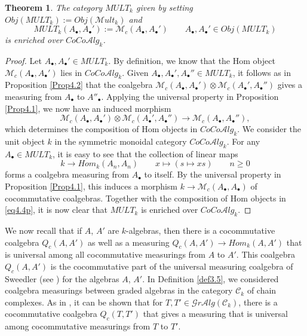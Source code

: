 \documentclass[10pt, colorlinks]{article}
\numberwithin{equation}{section} \DeclareMathSizes{2}{10}{12}{13}
\newtheorem{Thm}[thm]{Theorem}
\begin{document}
   
     \begin{Thm}\label{T4.3xq} The category $MULT_k$ given by setting      $Obj(MULT_k):=Obj(\mathscr Mult_k)$ and
\begin{equation}
MULT_k(A_\bullet,A_\bullet'):=\mathcal M_c(A_\bullet,A_\bullet') \qquad A_\bullet,A_\bullet'\in Obj(MULT_k)
\end{equation}
  is enriched over $CoCo\mathcal{A}lg_k$.
    \end{Thm}


    
    \begin{proof}
    Let $A_\bullet,A_\bullet'\in {M}ULT_k$. By definition, we know that the Hom object $\mathcal M_c(A_\bullet,A_\bullet')$ lies in $CoCo\mathcal Alg_k$.  Given $A_\bullet,A_\bullet',A_\bullet''\in MULT_k$,  it follows as in Proposition \ref{Prop4.2} that  the coalgebra $ \mathcal M_c(A_\bullet,A_\bullet')\otimes \mathcal M_c(A_\bullet',A_\bullet'')$ gives a measuring from $A_\bullet$ to $A''_\bullet$. Applying the universal property in Proposition \ref{Prop4.1}, we now have an induced morphism
        \begin{equation}\label{eq4.4p}
            \mathcal M_c(A_\bullet,A_\bullet')\otimes \mathcal M_c(A_\bullet',A_\bullet'')\longrightarrow  \mathcal M_c(A_\bullet,A_\bullet''),
        \end{equation} 
        which determines the composition of Hom objects in $CoCo\mathcal Alg_k$. We consider the unit object $k$ in the symmetric monoidal category $ CoCo\mathcal Alg_k$. For any  $A_\bullet\in MULT_k$, it is easy to see that the collection of linear maps
        \begin{equation}
            k\longrightarrow  {Hom}_k(A_n,A_n)\qquad x\mapsto (s\mapsto xs)\qquad n\geq 0
        \end{equation}
         forms a coalgebra measuring from $A_\bullet$ to itself. By the universal property in Proposition \ref{Prop4.1}, this induces a morphism $k\longrightarrow \mathcal M_c(A_\bullet, A_\bullet)$ of cocommutative coalgebras. Together with the composition of Hom objects in \eqref{eq4.4p}, it is now clear that $MULT_k$ is enriched over $CoCo\mathcal Alg_k$.
    \end{proof}


    
   We now recall that if $A$, $A'$ are $k$-algebras, then there is a  cocommutative coalgebra $Q_c(A, A')$ as well as a measuring 
$Q_c(A,A')\longrightarrow Hom_k(A,A')$ that is universal among all cocommutative measurings from $A$ to $A'$. This coalgebra $Q_c(A,A')$ is the cocommutative part of the universal measuring coalgebra of Sweedler  (see \cite[Theorem 7.0.4]{SW}) for the algebras $A$, $A'$. In Definition \ref{def3.5}, we considered coalgebra measurings between graded algebras in the category $\mathcal C_k$ of chain complexes. As in  \cite[Theorem 7.0.4]{SW}, it can be shown that for $T,T'\in \mathscr Gr\mathcal Alg(\mathcal C_k)$, there is a  cocommutative coalgebra $Q_c(T,T')$ that gives a measuring that is universal among cocommutative measurings from $T$ to $T'$.   
\end{document}
